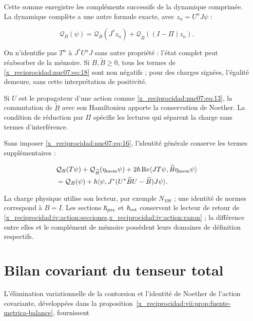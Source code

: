 Cette somme enregistre les compléments successifs de la dynamique comprimée. La dynamique complète a une autre formule exacte, avec \(z_n=U^nJ\psi\) :

\begin{equation}
\mathcal Q_B(\psi)=
\mathcal Q_B(J^*z_n)+
\mathcal Q_{\widetilde B}((I-\Pi)z_n).
\label{x_reciprocidad:nuc07:eq:19}
\end{equation}

On n’identifie pas \(T^n\) à \(J^*U^nJ\) sans autre propriété : l’état complet peut réabsorber de la mémoire. Si \(B,\widetilde B\ge0\), tous les termes de \eqref{x_reciprocidad:nuc07:eq:18} sont non négatifs ; pour des charges signées, l’égalité demeure, sans cette interprétation de positivité.

Si \(U\) est le propagateur d’une action comme \eqref{x_reciprocidad:nuc07:eq:13}, la commutation de \(\widetilde B\) avec son Hamiltonien apporte la conservation de Noether. La condition de réduction par \(\Pi\) spécifie les lectures qui séparent la charge sans termes d’interférence.

Sans imposer \eqref{x_reciprocidad:nuc07:eq:16}, l’identité générale conserve les termes supplémentaires :

\begin{equation}
\begin{aligned}
&\mathcal Q_B(T\psi)+\mathcal Q_{\widetilde B}(\eta_{\rm mem}\psi)
+2\hbar\operatorname{Re}
\langle JT\psi,\widetilde B\eta_{\rm mem}\psi\rangle\\
&=\mathcal Q_B(\psi)+
\hbar\langle\psi,J^*(U^*\widetilde BU-\widetilde B)J\psi\rangle.
\end{aligned}
\label{x_reciprocidad:nuc07:eq:20}
\end{equation}

La charge physique utilise son lecteur, par exemple \(N_{108}\) ; une identité de normes correspond à \(B=I\). Les sections \(\hbar_{\rm pre}\) et \(\hbar_{\rm ret}\) conservent le lecteur de retour de \cref{x_reciprocidad:iv:action:secciones,x_reciprocidad:iv:action:razon} ; la différence entre elles et le complément de mémoire possèdent leurs domaines de définition respectifs.

\section{Bilan covariant du tenseur total}

L’élimination variationnelle de la contorsion et l’identité de Noether de l’action covariante, développées dans la proposition~\ref{x_reciprocidad:vii:prop:fuente-metrica-balance}, fournissent


